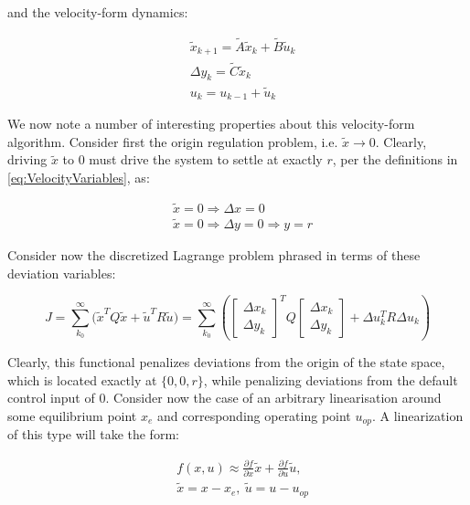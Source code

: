 and the velocity-form dynamics:

\begin{align}\label{eq:VelocityDynamics}
	&\tilde{x}_{k+1} = \tilde{A}\tilde{x}_k + \tilde{B}\tilde{u}_k \\
	&\Delta y_k = \tilde{C}\tilde{x}_k \\
	&u_k = u_{k-1} + \tilde{u}_k
\end{align}

We now note a number of interesting properties about this velocity-form algorithm. Consider first the origin regulation problem, i.e. $\tilde{x} \rightarrow 0$. Clearly, driving $\tilde{x}$ to $0$ must drive the system to settle at exactly $r$, per the definitions in \cref{eq:VelocityVariables}, as:

\begin{equation}\label{eq:VelocityDriveToOrigin}
	\begin{split}
		&\tilde{x} = 0 \Rightarrow \Delta x = 0 \\ 
		&\tilde{x} = 0 \Rightarrow \Delta y = 0 \Rightarrow y = r
	\end{split}
\end{equation}

Consider now the discretized Lagrange problem phrased in terms of these deviation variables:

\begin{equation}\label{eq:LagrangeProblemDeviation}
	J = \sum_{k_0}^{\infty} \big(\tilde{x}^TQ\tilde{x} + \tilde{u}^TR\tilde{u}\big) = \sum_{k_0}^{\infty}\left( \begin{bmatrix} \Delta x_k \\ \Delta y_k\end{bmatrix}^T Q
	\begin{bmatrix} \Delta x_k \\ \Delta y_k\end{bmatrix} + 
	\Delta u_k^TR\Delta u_k \right)
\end{equation} 

Clearly, this functional penalizes deviations from the origin of the state space, which is located exactly at $\{0,0,r\}$, while penalizing deviations from the default control input of $0$. Consider now the case of an arbitrary linearisation around some equilibrium point $x_{e}$ and corresponding operating point $u_{op}$. A linearization of this type will take the form:

\begin{equation}\label{eq:LinearizationAroundOP}
	\begin{split}
	&f(x,u) \approx \frac{\partial f}{\partial x} \tilde{x} + \frac{\partial f}{\partial u} \tilde{u}, \\ 
	&\tilde{x} = x-x_e, \ \tilde{u} = u - u_{op}
	\end{split}
\end{equation}

